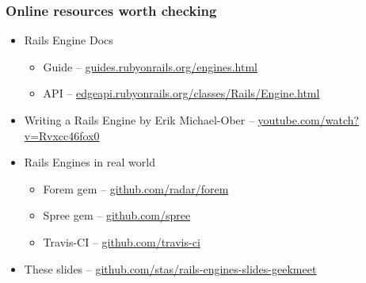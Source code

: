 \documentclass[compress]{beamer}
\begin{document}
\begin{frame}
\frametitle{Online resources worth checking}

\begin{itemize}
  \item Rails Engine Docs
    \begin{itemize}
      \item Guide -- \href{http://guides.rubyonrails.org/engines.html}{guides.rubyonrails.org/engines.html}
      \item API -- \href{http://edgeapi.rubyonrails.org/classes/Rails/Engine.html}{edgeapi.rubyonrails.org/classes/Rails/Engine.html}
    \end{itemize}
  \item Writing a Rails Engine by Erik Michael-Ober -- \href{http://www.youtube.com/watch?v=Rvxcc46fox0}{youtube.com/watch?v=Rvxcc46fox0}
  \item Rails Engines in real world
    \begin{itemize}
      \item Forem gem -- \href{https://github.com/radar/forem}{github.com/radar/forem}
      \item Spree gem -- \href{https://github.com/spree}{github.com/spree}
      \item Travis-CI -- \href{https://github.com/travis-ci}{github.com/travis-ci}
    \end{itemize}
  \item These slides -- \href{https://github.com/stas/rails-engines-slides-geekmeet}{github.com/stas/rails-engines-slides-geekmeet}
\end{itemize}

\end{frame}
\end{document}
